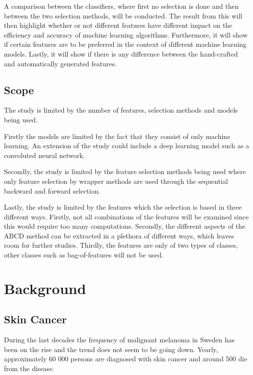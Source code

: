 \documentclass{kththesis}
\begin{document}
A comparison between the classifiers, where first no selection is done and then between the two selection methods, will be conducted. The result from this will then highlight whether or not different features have different impact on the efficiency and accuracy of machine learning algorithms. Furthermore, it will show if certain features are to be preferred in the context of different machine learning models. Lastly, it will show if there is any difference between the hand-crafted and automatically generated features.

\section{Scope}

The study is limited by the number of features, selection methods and models being used.

Firstly the models are limited by the fact that they consist of only machine learning. An extension of the study could include a deep learning model such as a convoluted neural network.

Secondly, the study is limited by the feature selection methods being used where only feature selection by wrapper methods are used through the sequential backward and forward selection.

Lastly, the study is limited by the features which the selection is based in three different ways. Firstly, not all combinations of the features will be examined since this would require too many computations. Secondly, the different aspects of the ABCD method can be extracted in a plethora of different ways, which leaves room for further studies. Thirdly, the features are only of two types of classes, other classes such as bag-of-features will not be used.


\chapter{Background}

\section{Skin Cancer}



During the last  decades the frequency of malignant melanoma in Sweden has been on the rise and the trend does not seem to be going down. Yearly, approximately 60 000 persons are diagnosed with skin cancer and around 500 die from the disease. \parencite{sverige-hudcancer}
\end{document}
